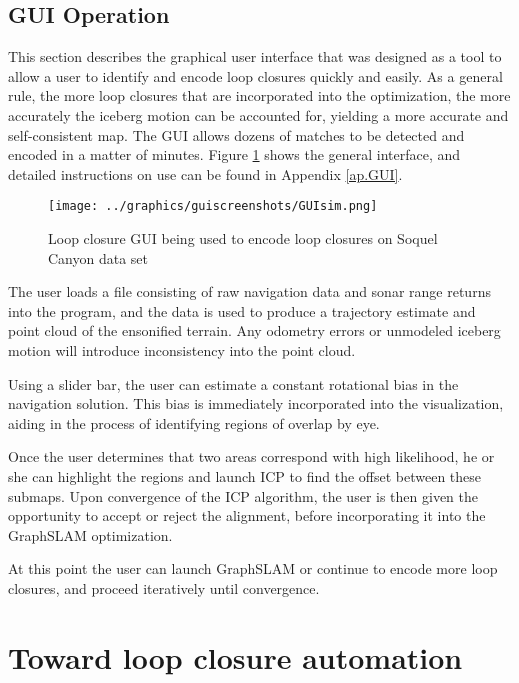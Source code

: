 \subsection{GUI Operation}

This section describes the graphical user interface that was designed as a tool to allow a user to identify and encode loop closures quickly and easily. As a general rule, the more loop closures that are incorporated into the optimization, the more accurately the iceberg motion can be accounted for, yielding a more accurate and self-consistent map. The GUI allows dozens of matches to be detected and encoded in a matter of minutes. Figure \ref{fig:GUI1} shows the general interface, and detailed instructions on use can be found in Appendix \ref{ap.GUI}.

 \begin{figure}[ht]
   \centering
   \texttt{[image: ../graphics/guiscreenshots/GUIsim.png]} %
   \caption{Loop closure GUI being used to encode loop closures on Soquel Canyon data set }
   \label{fig:GUI1}
\end{figure}

The user loads a file consisting of raw navigation data and sonar range returns into the program, and the data is used to produce a trajectory estimate and point cloud of the ensonified terrain. Any odometry errors or unmodeled iceberg motion will introduce inconsistency into the point cloud. 

Using a slider bar, the user can estimate a constant rotational bias in the navigation solution. This bias is immediately incorporated into the visualization, aiding in the process of identifying regions of overlap by eye. 

Once the user determines that two areas correspond with high likelihood, he or she can highlight the regions and launch ICP to find the offset between these submaps. Upon convergence of the ICP algorithm, the user is then given the opportunity to accept or reject the alignment, before incorporating it into the GraphSLAM optimization. 

At this point the user can launch GraphSLAM or continue to encode more loop closures, and proceed iteratively until convergence.


\section{Toward loop closure automation}

